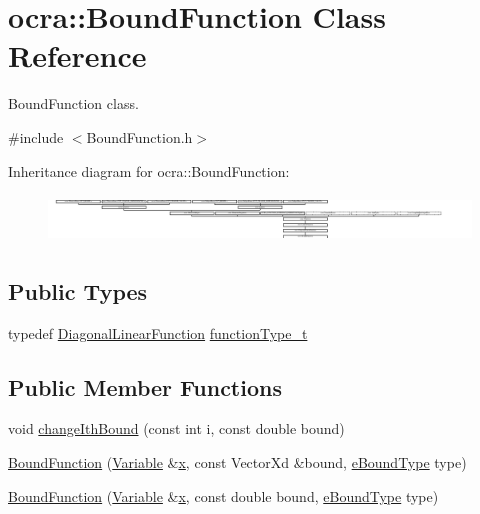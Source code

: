 \hypertarget{classocra_1_1BoundFunction}{}\section{ocra\+:\+:Bound\+Function Class Reference}
\label{classocra_1_1BoundFunction}


Bound\+Function class.  




{\ttfamily \#include $<$Bound\+Function.\+h$>$}

Inheritance diagram for ocra\+:\+:Bound\+Function\+:\begin{figure}[H]
\begin{center}
\leavevmode
\includegraphics[height=1.262480cm]{dd/d77/classocra_1_1BoundFunction}
\end{center}
\end{figure}
\subsection*{Public Types}
\begin{DoxyCompactItemize}
\item 
typedef \hyperlink{classocra_1_1DiagonalLinearFunction}{Diagonal\+Linear\+Function} \hyperlink{classocra_1_1BoundFunction_acba2ac4d2f6caf04054590615a41ac21}{function\+Type\+\_\+t}
\end{DoxyCompactItemize}
\subsection*{Public Member Functions}
\begin{DoxyCompactItemize}
\item 
void \hyperlink{classocra_1_1BoundFunction_ad9a5cb9442e2129111d189e8063304ad}{change\+Ith\+Bound} (const int i, const double bound)
\end{DoxyCompactItemize}
{\bf }\par
\begin{DoxyCompactItemize}
\item 
\hyperlink{classocra_1_1BoundFunction_a7dc079453fdb607b46295246153481fd}{Bound\+Function} (\hyperlink{classocra_1_1Variable}{Variable} \&\hyperlink{classocra_1_1Function_a28825886d1f149c87b112ec2ec1dd486}{x}, const Vector\+Xd \&bound, \hyperlink{namespaceocra_ab3efdc117d9e5bcb0192640f5e7dc79b}{e\+Bound\+Type} type)
\item 
\hyperlink{classocra_1_1BoundFunction_afba908c0284f8ce9b2f7f1f8e5338cb5}{Bound\+Function} (\hyperlink{classocra_1_1Variable}{Variable} \&\hyperlink{classocra_1_1Function_a28825886d1f149c87b112ec2ec1dd486}{x}, const double bound, \hyperlink{namespaceocra_ab3efdc117d9e5bcb0192640f5e7dc79b}{e\+Bound\+Type} type)
\end{DoxyCompactItemize}

